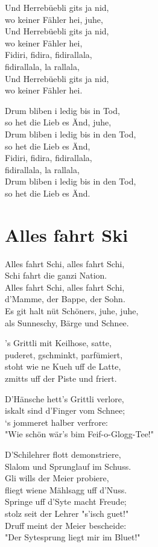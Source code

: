 \documentclass[
  letterpaper,
]{scrbook}
\begin{document}
Und Herrebüebli git\textquotesingle s ja nid,\\
wo keiner Fähler hei, juhe,\\
Und Herrebüebli git\textquotesingle s ja nid,\\
wo keiner Fähler hei,\\
Fidiri, fidira, fidirallala,\\
fidirallala, la rallala,\\
Und Herrebüebli git\textquotesingle s ja nid,\\
wo keiner Fähler hei.

Drum bliben i ledig bis in Tod,\\
so het die Lieb es Änd, juhe,\\
Drum bliben i ledig bis in den Tod,\\
so het die Lieb es Änd,\\
Fidiri, fidira, fidirallala,\\
fidirallala, la rallala,\\
Drum bliben i ledig bis in den Tod,\\
so het die Lieb es Änd.

\hypertarget{alles-fahrt-ski}{%
\chapter{Alles fahrt Ski}\label{alles-fahrt-ski}}

Alles fahrt Schi, alles fahrt Schi,\\
Schi fahrt die ganzi Nation.\\
Alles fahrt Schi, alles fahrt Schi,\\
d'Mamme, der Bappe, der Sohn.\\
Es git halt nüt Schöners, juhe, juhe,\\
als Sunneschy, Bärge und Schnee.

's Grittli mit Keilhose, satte,\\
puderet, gschminkt, parfümiert,\\
stoht wie ne Kueh uff de Latte,\\
zmitts uff der Piste und friert.

D'Hänsche hett's Grittli verlore,\\
iskalt sind d'Finger vom Schnee;\\
`s jommeret halber verfrore:\\
"Wie schön wär's bim Feif-o-Glogg-Tee!"

D'Schilehrer flott demonstriere,\\
Slalom und Sprunglauf im Schuss.\\
Gli wills der Meier probiere,\\
fliegt wiene Mählsagg uff d'Nuss.\\
Springe uff d'Syte macht Freude;\\
stolz seit der Lehrer "s'isch guet!"\\
Druff meint der Meier bescheide:\\
"Der Sytesprung liegt mir im Bluet!"
\end{document}
